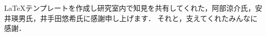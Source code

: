 \begin{acknowledgment}

LaTeXテンプレートを作成し研究室内で知見を共有してくれた，阿部涼介氏，安井瑛男氏，井手田悠希氏に感謝申し上げます．
それと，支えてくれたみんなに感謝．

\end{acknowledgment}
